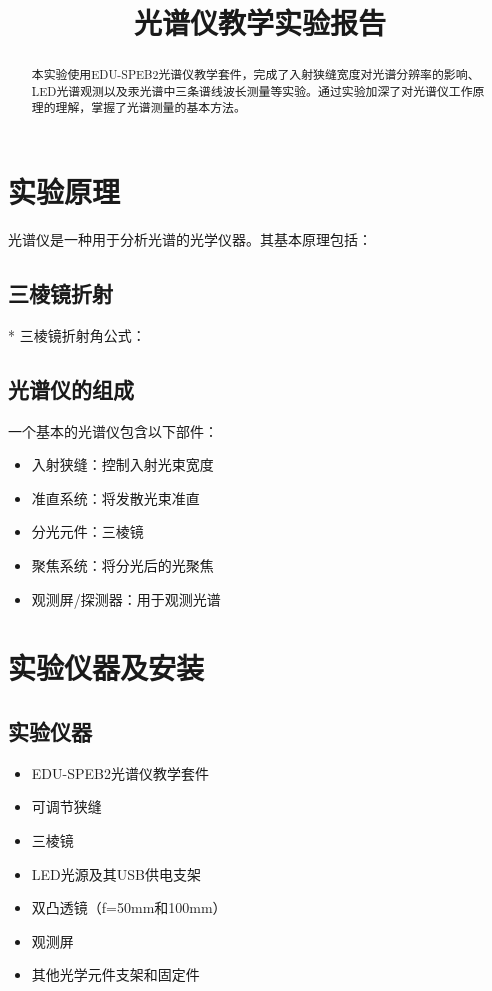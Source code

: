\documentclass{ctexart}
\title{光谱仪教学实验报告}
\begin{document}
\maketitle

\begin{abstract}
本实验使用EDU-SPEB2光谱仪教学套件，完成了入射狭缝宽度对光谱分辨率的影响、LED光谱观测以及汞光谱中三条谱线波长测量等实验。通过实验加深了对光谱仪工作原理的理解，掌握了光谱测量的基本方法。
\end{abstract}

\section{实验原理}

光谱仪是一种用于分析光谱的光学仪器。其基本原理包括：

\subsection{三棱镜折射}
* 三棱镜折射角公式：

\subsection{光谱仪的组成}
一个基本的光谱仪包含以下部件：
\begin{itemize}
    \item 入射狭缝：控制入射光束宽度
    \item 准直系统：将发散光束准直
    \item 分光元件：三棱镜
    \item 聚焦系统：将分光后的光聚焦
    \item 观测屏/探测器：用于观测光谱
\end{itemize}

\section{实验仪器及安装}
\subsection{实验仪器}
\begin{itemize}
    \item EDU-SPEB2光谱仪教学套件
    \item 可调节狭缝
    \item 三棱镜
    \item LED光源及其USB供电支架
    \item 双凸透镜（f=50mm和100mm）
    \item 观测屏
    \item 其他光学元件支架和固定件
\end{itemize}
\end{document}
